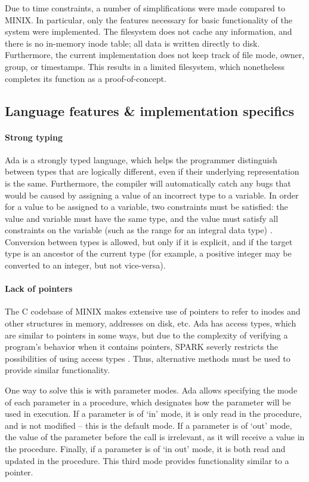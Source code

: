 Due to time constraints, a number of simplifications were made compared to MINIX.
In particular, only the features necessary for basic functionality of the system were implemented.
The filesystem does not cache any information, and there is no in-memory inode table; all data is written directly to disk.
Furthermore, the current implementation does not keep track of file mode, owner, group, or timestamps.
This results in a limited filesystem, which nonetheless completes its function as a proof-of-concept.

\subsection{Language features \& implementation specifics}
\paragraph{Strong typing}
Ada is a strongly typed language, which helps the programmer distinguish between types that are logically different, even if their underlying representation is the same.
Furthermore, the compiler will automatically catch any bugs that would be caused by assigning a value of an incorrect type to a variable.
In order for a value to be assigned to a variable, two constraints must be satisfied: the value and variable must have the same type, and the value must satisfy all constraints on the variable (such as the range for an integral data type) \cite{barnes2014}.
Conversion between types is allowed, but only if it is explicit, and if the target type is an ancestor of the current type (for example, a positive integer may be converted to an integer, but not vice-versa).

\paragraph{Lack of pointers}
The C codebase of MINIX makes extensive use of pointers to refer to inodes and other structures in memory, addresses on disk, etc.
Ada has access types, which are similar to pointers in some ways, but due to the complexity of verifying a program's behavior when it contains pointers, SPARK severly restricts the possibilities of using access types \cite{sparkRM}.
Thus, alternative methods must be used to provide similar functionality.

One way to solve this is with parameter modes.
Ada allows specifying the mode of each parameter in a procedure, which designates how the parameter will be used in execution.
If a parameter is of `in' mode, it is only read in the procedure, and is not modified -- this is the default mode.
If a parameter is of `out' mode, the value of the parameter before the call is irrelevant, as it will receive a value in the procedure.
Finally, if a parameter is of `in out' mode, it is both read and updated in the procedure.
This third mode provides functionality similar to a pointer.

